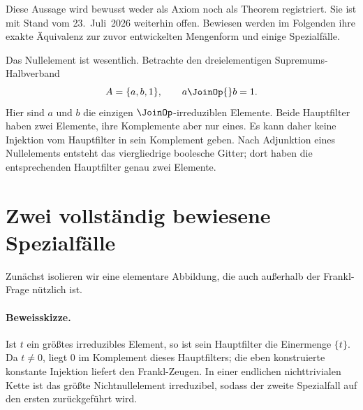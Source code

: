 \documentclass[main.tex]{subfiles}
\begin{document}
Diese Aussage wird bewusst weder als Axiom noch als Theorem registriert. Sie
ist mit Stand vom 23.~Juli~2026 weiterhin offen. Bewiesen werden im Folgenden
ihre exakte Äquivalenz zur zuvor entwickelten Mengenform und einige Spezialfälle.

\begin{remark}
Das Nullelement ist wesentlich. Betrachte den dreielementigen Supremums-Halbverband
\[
  A=\{a,b,1\},\qquad a\JoinOp{}b=1.
\]
Hier sind \(a\) und \(b\) die einzigen \(\JoinOp\)-irreduziblen Elemente. Beide
Hauptfilter haben zwei Elemente, ihre
Komplemente aber nur eines. Es kann daher keine Injektion vom Hauptfilter in
sein Komplement geben. Nach Adjunktion eines Nullelements entsteht das
viergliedrige boolesche Gitter; dort haben die entsprechenden Hauptfilter
genau zwei Elemente.
\end{remark}

\section{Zwei vollständig bewiesene Spezialfälle}

Zunächst isolieren wir eine elementare Abbildung, die auch außerhalb der
Frankl-Frage nützlich ist.


\paragraph{Beweisskizze.}
Ist \(t\) ein größtes irreduzibles Element, so ist sein Hauptfilter die
Einermenge \(\{t\}\). Da \(t\neq0\), liegt \(0\) im Komplement dieses
Hauptfilters; die eben konstruierte konstante Injektion liefert den
Frankl-Zeugen. In einer endlichen nichttrivialen Kette ist das größte
Nichtnullelement irreduzibel, sodass der zweite Spezialfall auf den ersten
zurückgeführt wird.
\end{document}

